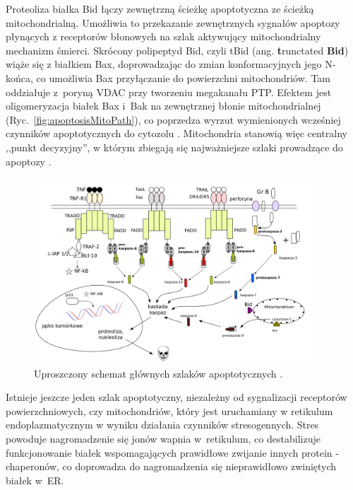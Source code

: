 Proteoliza białka Bid łączy zewnętrzną ścieżkę apoptotyczna ze ścieżką mitochondrialną. Umożliwia to przekazanie zewnętrznych sygnałów apoptozy płynących z receptorów błonowych na szlak aktywujący mitochondrialny mechanizm śmierci. Skrócony polipeptyd Bid, czyli tBid (ang. \textbf{t}runctated \textbf{Bid}) wiąże się z białkiem Bax, doprowadzając do zmian konformacyjnych jego N-końca, co umożliwia Bax przyłączanie do powierzchni mitochondriów. Tam oddziałuje z~poryną VDAC przy tworzeniu megakanału PTP. Efektem jest oligomeryzacja białek Bax i~Bak na zewnętrznej błonie mitochondrialnej (Ryc.~\ref{fig:apoptosisMitoPath}), co poprzedza wyrzut wymienionych wcześniej czynników apoptotycznych do cytozolu \cite{Scorrano2003,Tsujimoto2003}. Mitochondria stanowią więc centralny ,,punkt decyzyjny'', w którym zbiegają się najważniejsze szlaki prowadzące do apoptozy \cite{Desagher2000,Leo2005}.

\begin{figure}
\centering
\includegraphics[width=0.95\textwidth]{rysunki/rozdzial_1/apoptoza.png}
\caption[Uproszczony schemat szlaków apoptotycznych]{Uproszczony schemat głównych szlaków apoptotycznych \cite{Desagher2000}.}
\label{fig:apoptoza}
\end{figure}

Istnieje jeszcze jeden szlak apoptotyczny, niezależny od sygnalizacji receptorów powierzchniowych, czy mitochondriów, który jest uruchamiany w retikulum endoplazmatycznym w wyniku działania czynników stresogennych. Stres powoduje nagromadzenie się jonów wapnia w~retikulum, co destabilizuje funkcjonowanie białek wspomagających prawidłowe zwijanie innych protein - chaperonów, co doprowadza do nagromadzenia się nieprawidłowo zwiniętych białek w~ER.

